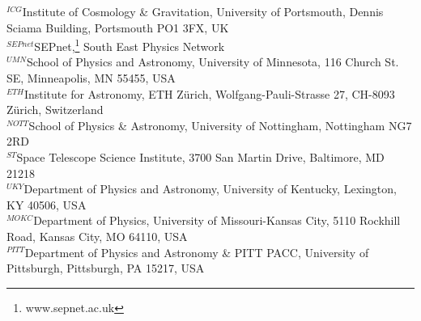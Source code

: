 \documentclass[useAMS,usenatbib]{mn2e}
\begin{document}
{%
$^{ICG}$Institute of Cosmology \& Gravitation, University of Portsmouth, Dennis Sciama Building, Portsmouth PO1 3FX, UK\\
$^{SEPnet}$SEPnet,\thanks{www.sepnet.ac.uk} South East Physics Network\\
$^{UMN}$School of Physics and Astronomy, University of Minnesota, 116 Church St. SE, Minneapolis, MN 55455, USA\\
$^{ETH}$Institute for Astronomy, ETH Z\"urich, Wolfgang-Pauli-Strasse 27, CH-8093 Z\"urich, Switzerland\\
$^{NOTT}$School of Physics \& Astronomy, University of Nottingham, Nottingham NG7 2RD\\
$^{ST}$Space Telescope Science Institute, 3700 San Martin Drive, Baltimore, MD 21218\\
$^{UKY}$Department of Physics and Astronomy, University of Kentucky, Lexington, KY 40506, USA\\
$^{MOKC}$Department of Physics, University of Missouri-Kansas City, 5110 Rockhill Road, Kansas City, MO 64110, USA\\
$^{PITT}$Department of Physics and Astronomy \& PITT PACC, University of Pittsburgh, Pittsburgh, PA 15217, USA\\
}
\end{document}
